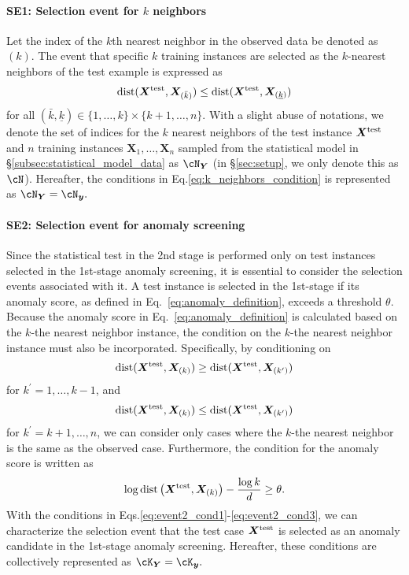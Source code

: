\paragraph{SE1: Selection event for $k$ neighbors}
%
Let the index of the $k$th nearest neighbor in the observed data be denoted as $(k)$.
%
The event that specific $k$ training instances are selected as the $k$-nearest neighbors of the test example is expressed as  
\begin{align}
 \label{eq:k_neighbors_condition}
 {\rm dist}(\bm X^{\rm test}, \bm X_{(\bar{k})}) \le {\rm dist}(\bm X^{\rm test}, \bm X_{(\underline{k})})
\end{align}
for all $(\bar{k}, \underline{k}) \in \{1, \ldots, k\} \times \{k+1, \ldots, n\}$.
%
With a slight abuse of notations, we denote the set of indices for the $k$ nearest neighbors of the test instance $\bm X^{\rm test}$ and $n$ training instances $\bm X_1, \ldots, \bm X_n$ sampled from the statistical model in \S\ref{subsec:statistical_model_data} as $\cN_{\bm Y}$ (in \S\ref{sec:setup}, we only denote this as $\cN$).
%
Hereafter, the conditions in Eq.\eqref{eq:k_neighbors_condition} is represented as $\cN_{\bm Y} = \cN_{\bm y}.$

\paragraph{SE2: Selection event for anomaly screening}
%
Since the statistical test in the 2nd stage is performed only on test instances selected in the 1st-stage anomaly screening, it is essential to consider the selection events associated with it.
%
A test instance is selected in the 1st-stage if its anomaly score, as defined in Eq.~\eqref{eq:anomaly_definition}, exceeds a threshold $\theta$.
%
Because the anomaly score in Eq.~\eqref{eq:anomaly_definition} is calculated based on the $k$-the nearest neighbor instance, the condition on the $k$-the nearest neighbor instance must also be incorporated.
%
Specifically, by conditioning on
\begin{align}
 \label{eq:event2_cond1}
 {\rm dist}(\bm X^{\rm test}, \bm X_{(k)})
 \ge
 {\rm dist}(\bm X^{\rm test}, \bm X_{(k^\prime)})
\end{align}
for $k^\prime = 1, \ldots, k-1$, and 
\begin{align}
 \label{eq:event2_cond2}
 {\rm dist}(\bm X^{\rm test}, \bm X_{(k)})
 \le
 {\rm dist}(\bm X^{\rm test}, \bm X_{(k^\prime)})
\end{align}
for $k^\prime = k+1, \ldots, n$, we can consider only cases where the $k$-the nearest neighbor is the same as the observed case.
%
Furthermore, the condition for the anomaly score is written as
\begin{align}
 \label{eq:event2_cond3}
 \log {\rm dist}\left(\bm X^{\rm test}, \bm X_{(k)} \right) - \frac{\log k}{d} \ge \theta.
\end{align}
%
With the conditions in Eqs.\eqref{eq:event2_cond1}-\eqref{eq:event2_cond3}, we can characterize the selection event that the test case $\bm X^{\rm test}$ is selected as an anomaly candidate in the 1st-stage anomaly screening.
%
Hereafter, these conditions are collectively represented as $\cK_{\bm Y} = \cK_{\bm y}.$

